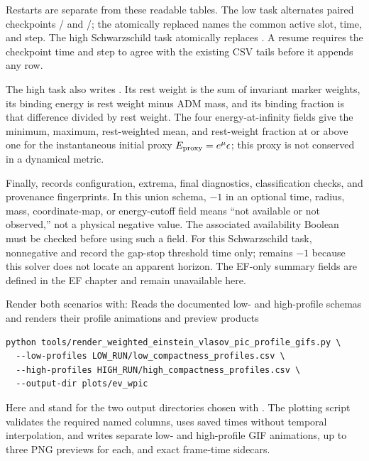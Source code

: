 Restarts are separate from these readable tables.  The low task alternates
paired checkpoints
/ and
/; the
atomically replaced  names the common active
slot, time, and step.  The high Schwarzschild task atomically replaces
.  A resume requires the checkpoint time and
step to agree with the existing CSV tails before it appends any row.

The high task also writes
.  Its rest weight is the
sum of invariant marker weights, its binding energy is rest weight minus ADM
mass, and its binding fraction is that difference divided by rest weight.  The
four energy-at-infinity fields give the minimum, maximum, rest-weighted mean,
and rest-weight fraction at or above one for the instantaneous initial proxy
\(E_{\rm proxy}=e^\mu\epsilon\); this proxy is not conserved in a dynamical
metric.

Finally,  records configuration, extrema, final diagnostics,
classification checks, and provenance fingerprints.  In this union schema,
\(-1\) in an optional time, radius, mass, coordinate-map, or energy-cutoff
field means ``not available or not observed,'' not a physical negative value.
The associated availability Boolean must be checked before using such a field.
For this Schwarzschild task, nonnegative  and
 record the gap-stop threshold time only;
 remains \(-1\) because this solver does not
locate an apparent horizon.  The EF-only summary fields are defined in the EF
chapter and remain unavailable here.

Render both scenarios with:
{}
{Reads the documented low- and high-profile schemas and renders their profile
 animations and preview products}
\begin{lstlisting}[basicstyle=\ttfamily\scriptsize]
python tools/render_weighted_einstein_vlasov_pic_profile_gifs.py \
  --low-profiles LOW_RUN/low_compactness_profiles.csv \
  --high-profiles HIGH_RUN/high_compactness_profiles.csv \
  --output-dir plots/ev_wpic
\end{lstlisting}
Here \code{LOW_RUN} and \code{HIGH_RUN} stand for the two output directories
chosen with .  The plotting script validates the required
named columns, uses saved times without temporal interpolation, and writes
separate low- and high-profile GIF animations, up to three PNG previews for
each, and exact frame-time sidecars.

